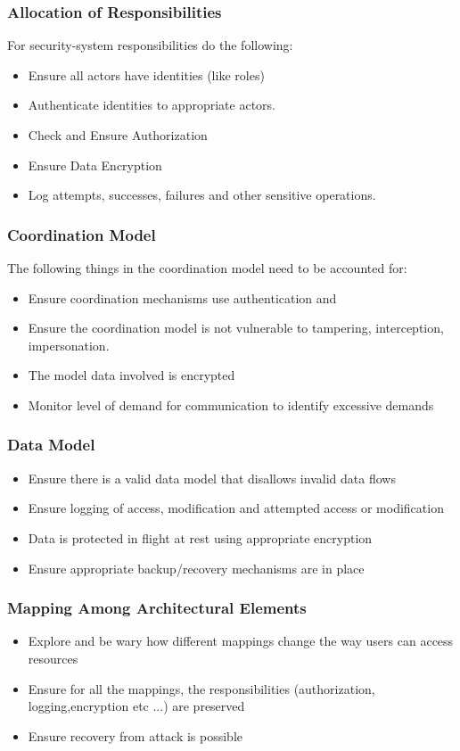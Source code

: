 \documentclass[a4paper]{article}
\begin{document}
\subsubsection{Allocation of Responsibilities}
For security-system responsibilities do the following:
\begin{itemize}
\item Ensure all actors have identities (like roles)
\item Authenticate identities to appropriate actors.
\item Check and Ensure Authorization
\item Ensure Data Encryption
\item Log attempts, successes, failures and other sensitive operations.
\end{itemize}

\subsubsection{Coordination Model}
The following things in the coordination model need to be accounted for:
\begin{itemize}
\item Ensure coordination mechanisms use authentication and 
\item Ensure the coordination model is not vulnerable to tampering, interception, impersonation.
\item The model data involved is encrypted
\item Monitor level of demand for communication to identify excessive demands
\end{itemize}

\subsubsection{Data Model}
\begin{itemize}
\item Ensure there is a valid data model that disallows invalid data flows
\item Ensure logging of access, modification and attempted access or modification
\item Data is protected in flight at rest using appropriate encryption
\item Ensure appropriate backup/recovery mechanisms are in place
\end{itemize}

\subsubsection{Mapping Among Architectural Elements}
\begin{itemize}
\item Explore and be wary how different mappings change the way users can access resources
\item Ensure for all the mappings, the responsibilities (authorization, logging,encryption etc ...) are preserved
\item Ensure recovery from attack is possible
\end{itemize}
\end{document}
